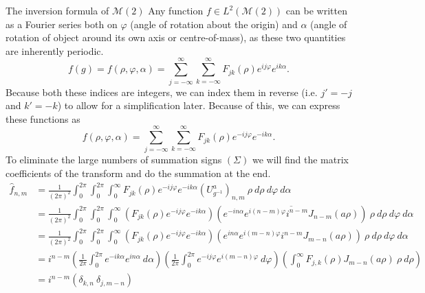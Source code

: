 \documentclass{article}
\begin{document}
\begin{Proof}{The inversion formula of $\mathcal{M}(2)$}
    Any function $f \in L^{2}(\mathcal{M}(2))$ can be written as a Fourier series both on $\varphi$ (angle of rotation about the origin) and $\alpha$ (angle of rotation of object around its own axis or centre-of-mass), as these two quantities are inherently periodic.
    \[%
        f(g) = f(\rho, \varphi, \alpha) = \sum_{j=-\infty}^{\infty} \sum_{k=-\infty}^{\infty} F_{jk}(\rho) e^{ij\varphi} e^{ik\alpha}
    .\]%
    Because both these indices are integers, we can index them in reverse (i.e. $j'=-j$ and $k'=-k$) to allow for a simplification later. Because of this, we can express these functions as
    \[%
        f(\rho, \varphi, \alpha) = \sum_{j=-\infty}^{\infty} \sum_{k=-\infty}^{\infty} F_{jk}(\rho) e^{-ij\varphi} e^{-ik\alpha} 
    .\]%
    To eliminate the large numbers of summation signs $(\Sigma)$ we will find the matrix coefficients of the transform and do the summation at the end.
    \[%
        \begin{split}
            \hat{f}_{n,m} &= \frac{1}{(2\pi)^{2}} \int^{2\pi}_{0}\int^{2\pi}_{0}\int^{\infty}_{0} F_{jk}(\rho) e^{-ij\varphi} e^{-ik\alpha} (U^{a}_{g^{-1}})_{n,m} \ \rho \ d\rho \ d\varphi \ d\alpha \\
                          &= \frac{1}{(2\pi)^{2}} \int^{2\pi}_{0}\int^{2\pi}_{0}\int^{\infty}_{0} \left( F_{jk}(\rho) e^{-ij\varphi} e^{-ik\alpha} \right) \left(
                          \overline{ e^{-in\alpha} e^{i(n-m)\varphi}i^{n-m}J_{n-m}(a\rho)}
                          \right) \ \rho \ d\rho \ d\varphi \ d\alpha \\
                          &= \frac{1}{(2\pi)^{2}} \int^{2\pi}_{0}\int^{2\pi}_{0}\int^{\infty}_{0} \left( F_{jk}(\rho) e^{-ij\varphi} e^{-ik\alpha} \right) \left( 
                          e^{in\alpha} e^{i(m-n)\varphi}i^{n-m}J_{m-n}(a\rho)
                          \right) \ \rho \ d\rho \ d\varphi \ d\alpha \\
                          &= 
                          i^{n-m}
                          \left( \frac{1}{2\pi} \int^{2\pi}_{0} e^{-ik\alpha} e^{in\alpha} \ d\alpha \right )
                          \left( \frac{1}{2\pi} \int^{2\pi}_{0} e^{-ij\varphi} e^{i(m-n)\varphi} \        d\varphi       \right )
                          \left( \int^{\infty}_{0} F_{j,k}(\rho) J_{m-n}(a\rho)  \ \rho \ d\rho          \right ) \\
                          &=
                          i^{n-m}
                          \left( \delta_{k, n} \ \delta_{j, m-n} \right)

\end{split}\]
\end{Proof}
\end{document}
